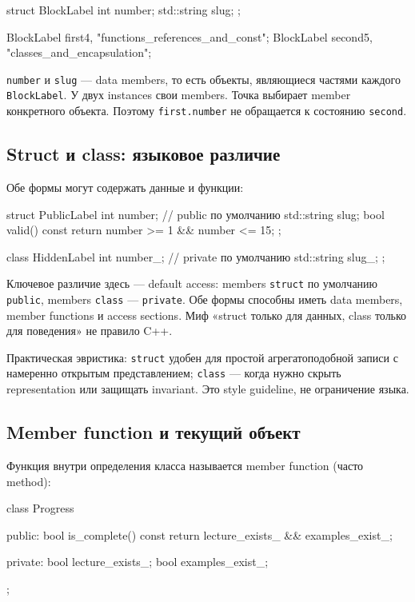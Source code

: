 \begin{cppcode}
struct BlockLabel {
    int number;
    std::string slug;
};

BlockLabel first{4, "functions_references_and_const"};
BlockLabel second{5, "classes_and_encapsulation"};
\end{cppcode}

\texttt{number} и \texttt{slug} --- data members, то есть объекты, являющиеся
частями каждого \texttt{BlockLabel}. У двух instances свои members. Точка
выбирает member конкретного объекта. Поэтому \texttt{first.number} не
обращается к состоянию \texttt{second}.

\subsection{Struct и class: языковое различие}

Обе формы могут содержать данные и функции:

\begin{cppcode}
struct PublicLabel {
    int number; // public по умолчанию
    std::string slug;
    bool valid() const { return number >= 1 && number <= 15; }
};

class HiddenLabel {
    int number_; // private по умолчанию
    std::string slug_;
};
\end{cppcode}

Ключевое различие здесь --- default access: members \texttt{struct} по
умолчанию \texttt{public}, members \texttt{class} --- \texttt{private}.
Обе формы способны иметь data members, member functions и access sections.
Миф «struct только для данных, class только для поведения» не правило C++.

Практическая эвристика: \texttt{struct} удобен для простой агрегатоподобной
записи с намеренно открытым представлением; \texttt{class} --- когда нужно
скрыть representation или защищать invariant. Это style guideline, не
ограничение языка.

\subsection{Member function и текущий объект}

Функция внутри определения класса называется member function (часто method):

\begin{cppcode}
class Progress {
public:
    bool is_complete() const {
        return lecture_exists_ && examples_exist_;
    }

private:
    bool lecture_exists_{};
    bool examples_exist_{};
};
\end{cppcode}

